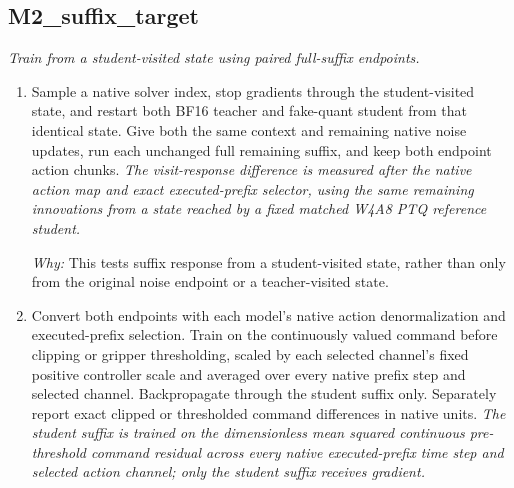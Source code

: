 \documentclass[10pt,a4paper]{article}
\begin{document}
\subsection*{M2\_suffix\_target}
\emph{Train from a student-visited state using paired full-suffix endpoints.}
\begin{enumerate}[leftmargin=*,start=3]
  \item Sample a native solver index, stop gradients through the student-visited state, and restart both BF16 teacher and fake-quant student from that identical state. Give both the same context and remaining native noise updates, run each unchanged full remaining suffix, and keep both endpoint action chunks.
\noindent\emph{The visit-response difference is measured after the native action map and exact executed-prefix selector, using the same remaining innovations from a state reached by a fixed matched W4A8 PTQ reference student.}
\par{}
\par\emph{Why:} This tests suffix response from a student-visited state, rather than only from the original noise endpoint or a teacher-visited state.
  \item Convert both endpoints with each model's native action denormalization and executed-prefix selection. Train on the continuously valued command before clipping or gripper thresholding, scaled by each selected channel's fixed positive controller scale and averaged over every native prefix step and selected channel. Backpropagate through the student suffix only. Separately report exact clipped or thresholded command differences in native units.
\noindent\emph{The student suffix is trained on the dimensionless mean squared continuous pre-threshold command residual across every native executed-prefix time step and selected action channel;\allowbreak{} only the student suffix receives gradient.}

\end{enumerate}
\end{document}
